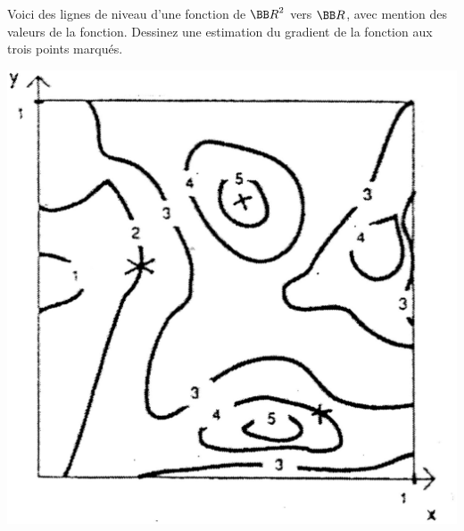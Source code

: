\documentclass[12pt,french,oneside,a4paper]{memoir} %
\begin{document}
\begin{exo}
Voici des lignes de niveau d'une fonction de ${\BB R}^2$ vers
$\BB R$, avec mention des valeurs de la fonction. Dessinez une
estimation du gradient de la fonction aux trois points marqués.

\begin{center}
\includegraphics[scale=0.2]{Fig_291_1test.eps}
\end{center}
\end{exo}
\end{document}
